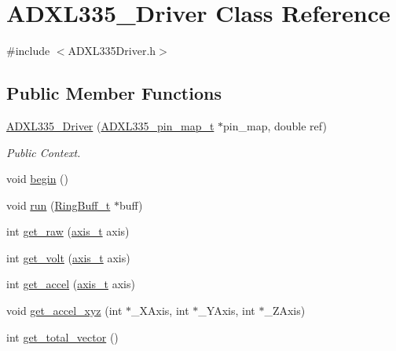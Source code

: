 \hypertarget{class_a_d_x_l335___driver}{\section{\-A\-D\-X\-L335\-\_\-\-Driver \-Class \-Reference}
\label{class_a_d_x_l335___driver}
}


{\ttfamily \#include $<$\-A\-D\-X\-L335\-Driver.\-h$>$}

\subsection*{\-Public \-Member \-Functions}
\begin{DoxyCompactItemize}
\item 
\hyperlink{class_a_d_x_l335___driver_a02a4f31abd2b0e5d57ec0b579dd5ee43}{\-A\-D\-X\-L335\-\_\-\-Driver} (\hyperlink{struct_a_d_x_l335__pin__map__t}{\-A\-D\-X\-L335\-\_\-pin\-\_\-map\-\_\-t} $\ast$pin\-\_\-map, double ref)
\begin{DoxyCompactList}\small\item\em \-Public \-Context. \end{DoxyCompactList}\item 
void \hyperlink{class_a_d_x_l335___driver_a59b15919c6331cd9461a1bdd4c76c9cd}{begin} ()
\item 
void \hyperlink{class_a_d_x_l335___driver_aac4c5aa339ed8acb9e109e3a4b1c2fd8}{run} (\hyperlink{struct_ring_buff__t}{\-Ring\-Buff\-\_\-t} $\ast$buff)
\item 
int \hyperlink{class_a_d_x_l335___driver_a2c7fc1ad1a43b35ffbc3ff81365b2b36}{get\-\_\-raw} (\hyperlink{_utilities_8h_ae7747145441b0591a5c04f20f6f9189a}{axis\-\_\-t} axis)
\item 
int \hyperlink{class_a_d_x_l335___driver_a6450cf850dc1bd28ff5004465ac794c0}{get\-\_\-volt} (\hyperlink{_utilities_8h_ae7747145441b0591a5c04f20f6f9189a}{axis\-\_\-t} axis)
\item 
int \hyperlink{class_a_d_x_l335___driver_aae84d9df4e2cc17804e6b65b56380446}{get\-\_\-accel} (\hyperlink{_utilities_8h_ae7747145441b0591a5c04f20f6f9189a}{axis\-\_\-t} axis)
\item 
void \hyperlink{class_a_d_x_l335___driver_a9d2a3cb74eae9505fc6c4c535929f82a}{get\-\_\-accel\-\_\-xyz} (int $\ast$\-\_\-\-X\-Axis, int $\ast$\-\_\-\-Y\-Axis, int $\ast$\-\_\-\-Z\-Axis)
\item 
int \hyperlink{class_a_d_x_l335___driver_ae2ea2184cdced49bbf81dd142558f0de}{get\-\_\-total\-\_\-vector} ()
\end{DoxyCompactItemize}


